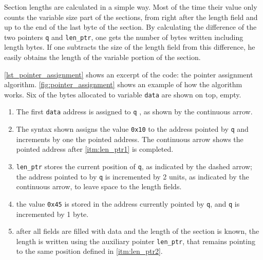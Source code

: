 \documentclass[
	12pt,				%
	openright,			%
	twoside,			%
	a4paper,			%
	brazil,
	french,				%
	english
	]{abntex2}
\begin{document}
Section lengths are calculated in a simple way. Most of the time their value only counts the variable size part of the sections, from right after the length field and up to the end of the last byte of the section. By calculating the difference of the two pointers \texttt{q} and \texttt{len\hspace{0.1mm}\_\hspace{0.1mm}ptr}, one gets the number of bytes written including length bytes. If one subtracts the size of the length field from this difference, he easily obtains the length of the variable portion of the section.

\autoref{lst_pointer_assignment} shows an excerpt of the code: the pointer assignment algorithm. \autoref{fig:pointer_assignment} shows an example of how the  algorithm works. Six of the bytes allocated to variable \texttt{data} are shown on top, empty.
\begin{enumerate}
\item The first \texttt{data} address is assigned to \texttt{q} , as shown by the continuous arrow.
\item \label{itm:len_ptr1} The syntax shown assigns the value \texttt{0x10} to the address pointed by \texttt{q} and increments by one the pointed address. The continuous arrow shows the pointed address after \autoref{itm:len_ptr1} is completed.
\item \label{itm:len_ptr2} \texttt{len\hspace{0.1mm}\_\hspace{0.1mm}ptr} stores the current position of \texttt{q}, as indicated by the dashed arrow; the address pointed to by \texttt{q} is incremented by 2 units, as indicated by the continuous arrow, to leave space to the length fields.
\item the value \texttt{0x45} is stored in the address currently pointed by \texttt{q}, and \texttt{q} is incremented by 1 byte.
\item after all fields are filled with data and the length of the section is known, the length is written using the auxiliary pointer \texttt{len\hspace{0.1mm}\_\hspace{0.1mm}ptr}, that remains pointing to the same position defined in \autoref{itm:len_ptr2}.
\end{enumerate}
\end{document}
